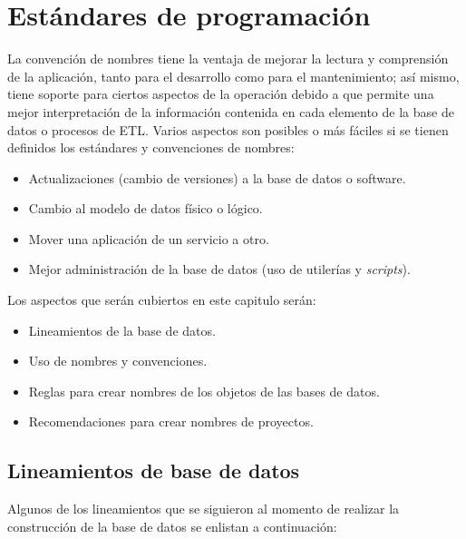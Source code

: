 \chapter{Estándares de programación}
\label{cap:estandares}

La convención de nombres tiene la ventaja de mejorar la lectura y comprensión de
la aplicación, tanto para el desarrollo como para el mantenimiento; así mismo,
tiene soporte para ciertos aspectos de la operación debido a que permite una
mejor interpretación de la información contenida en cada elemento de la base de
datos o procesos de ETL. Varios aspectos son posibles o más fáciles si se tienen
definidos los estándares y convenciones de nombres:

\begin{itemize}
\item Actualizaciones (cambio de versiones) a la base de datos o software.
\item Cambio al modelo de datos físico o lógico.
\item Mover una aplicación de un servicio a otro.
\item Mejor administración de la base de datos (uso de utilerías y
  \emph{scripts}).
\end{itemize}

Los aspectos que serán cubiertos en este capitulo serán:

\begin{itemize}
\item Lineamientos de la base de datos.
\item Uso de nombres y convenciones.
\item Reglas para crear nombres de los objetos de las bases de datos.
\item Recomendaciones para crear nombres de proyectos.
\end{itemize}

\section{Lineamientos de base de datos}

Algunos de los lineamientos que se siguieron al momento de realizar la
construcción de la base de datos se enlistan a continuación:

